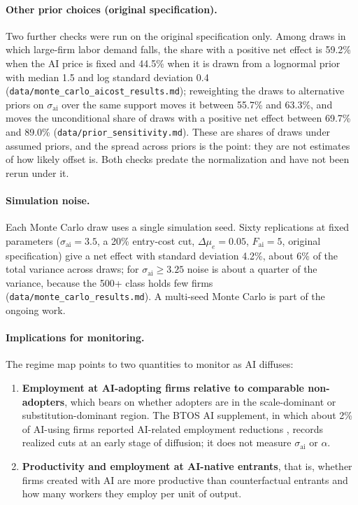 \paragraph{Other prior choices (original specification).}
Two further checks were run on the original specification only.
Among draws in which large-firm labor demand falls, the share with a positive net effect is 59.2\% when the AI price is fixed and 44.5\% when it is drawn from a lognormal prior with median 1.5 and log standard deviation 0.4 (\texttt{data/monte\_carlo\_aicost\_results.md}); reweighting the draws to alternative priors on $\sigma_{\text{ai}}$ over the same support moves it between 55.7\% and 63.3\%, and moves the unconditional share of draws with a positive net effect between 69.7\% and 89.0\% (\texttt{data/prior\_sensitivity.md}).
These are shares of draws under assumed priors, and the spread across priors is the point: they are not estimates of how likely offset is.
Both checks predate the normalization and have not been rerun under it.

\paragraph{Simulation noise.}
Each Monte Carlo draw uses a single simulation seed.
Sixty replications at fixed parameters ($\sigma_{\text{ai}} = 3.5$, a 20\% entry-cost cut, $\Delta\mu_e = 0.05$, $F_{\text{ai}} = 5$, original specification) give a net effect with standard deviation 4.2\%, about 6\% of the total variance across draws; for $\sigma_{\text{ai}} \ge 3.25$ noise is about a quarter of the variance, because the 500+ class holds few firms (\texttt{data/monte\_carlo\_results.md}).
A multi-seed Monte Carlo is part of the ongoing work.

\paragraph{Implications for monitoring.}
The regime map points to two quantities to monitor as AI diffuses:
\begin{enumerate}
  \item \textbf{Employment at AI-adopting firms relative to comparable non-adopters}, which bears on whether adopters are in the scale-dominant or substitution-dominant region. The BTOS AI supplement, in which about 2\% of AI-using firms reported AI-related employment reductions \citep{bonney2026}, records realized cuts at an early stage of diffusion; it does not measure $\sigma_{\text{ai}}$ or $\alpha$.
  \item \textbf{Productivity and employment at AI-native entrants}, that is, whether firms created with AI are more productive than counterfactual entrants and how many workers they employ per unit of output.
\end{enumerate}
